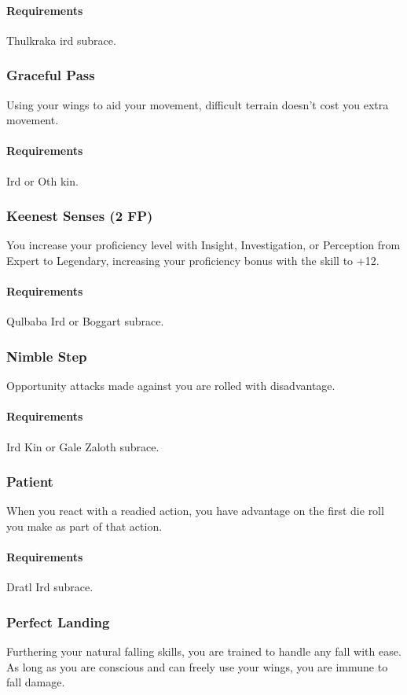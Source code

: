         \paragraph{Requirements} Thulkraka ird subrace.
    \subsubsection{Graceful Pass} \label{feat::gracefulpass}
        Using your wings to aid your movement, difficult terrain doesn't cost you extra movement.
        \paragraph{Requirements} Ird or Oth kin.
    \subsubsection{Keenest Senses (2 FP)} \label{feat::keenestsenses}
        You increase your proficiency level with Insight, Investigation, or Perception from Expert to Legendary, increasing your proficiency bonus with the skill to +12.
        \paragraph{Requirements} Qulbaba Ird or Boggart subrace.
    \subsubsection{Nimble Step} \label{feat::nimblestep}
        Opportunity attacks made against you are rolled with disadvantage.
        \paragraph{Requirements} Ird Kin or Gale Zaloth subrace.
    \subsubsection{Patient} \label{feat::patient}
        When you react with a readied action, you have advantage on the first die roll you make as part of that action.
        \paragraph{Requirements} Dratl Ird subrace.
    \subsubsection{Perfect Landing} \label{feat::perfectlanding}
        Furthering your natural falling skills, you are trained to handle any fall with ease.
        As long as you are conscious and can freely use your wings, you are immune to fall damage.
